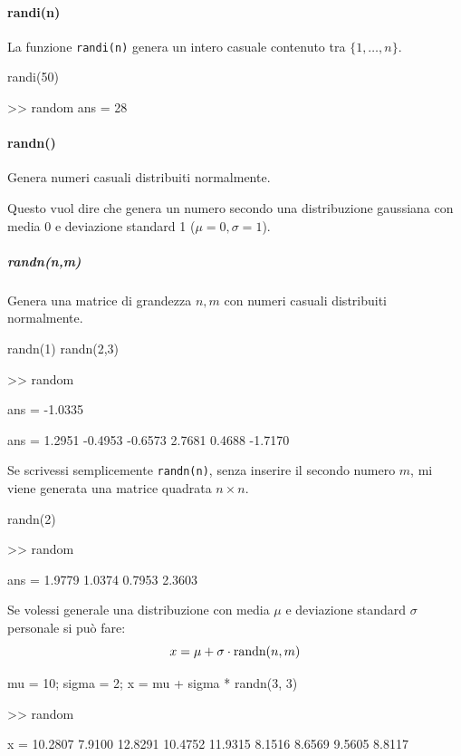 \paragraph{randi(n)} La funzione \verb|randi(n)| genera un intero casuale contenuto tra $ \{1,\dots,n\} $.
\begin{matlab}
randi(50)
\end{matlab}
\begin{matlabconsole}
>> random
ans =
    28
\end{matlabconsole}

\paragraph{randn()} Genera numeri casuali distribuiti normalmente.

Questo vuol dire che genera un numero secondo una distribuzione gaussiana con media 0 e deviazione standard 1 ($ \mu = 0, \sigma = 1 $).

\subparagraph{randn(n,m)} Genera una matrice di grandezza $ n,m $ con numeri casuali distribuiti normalmente.

\begin{matlab}
randn(1)
randn(2,3)
\end{matlab}
\begin{matlabconsole}
>> random

ans =
   -1.0335

ans =
    1.2951   -0.4953   -0.6573
    2.7681    0.4688   -1.7170
\end{matlabconsole}

\begin{note}
Se scrivessi semplicemente \verb|randn(n)|, senza inserire il secondo numero $ m $, mi viene generata una matrice quadrata $ n \times n $.
\begin{matlab}
randn(2)
\end{matlab}
\begin{matlabconsole}
>> random

ans =
    1.9779    1.0374
    0.7953    2.3603
\end{matlabconsole}
\end{note}

Se volessi generale una distribuzione con media $ \mu $ e deviazione standard $ \sigma $ personale si può fare:
\[
  x = \mu + \sigma \cdot \text{randn($ n,m $)}
\]

\begin{matlab}
mu = 10;
sigma = 2;
x = mu + sigma * randn(3, 3)
\end{matlab}
\begin{matlabconsole}
>> random

x =
   10.2807    7.9100   12.8291
   10.4752   11.9315    8.1516
    8.6569    9.5605    8.8117
\end{matlabconsole}


